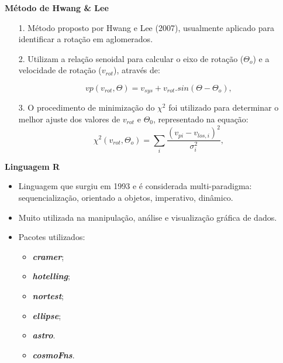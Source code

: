 \documentclass[xcolor=dvipsnames,10pt]{beamer}
\begin{document}
\begin{frame}{\textbf{Método de Hwang \& Lee}}
  \begin{enumerate}
    \item[1.] Método proposto por Hwang e Lee (2007), usualmente aplicado para identificar a rotação em aglomerados.
    \item[2.] Utilizam a relação senoidal para calcular o eixo de rotação ($\Theta_o$) e a velocidade de rotação ($v_{rot}$), através de:

    \begin{equation}
      vp(v_{rot}, \Theta) = v_{sys} + v_{rot} . sin(\Theta - \Theta_o) ,
      \label{eq:hwanglee1}
      \end{equation}
    \item[3.] O procedimento de minimização do $\chi^2$ foi utilizado para determinar o melhor ajuste dos valores de $v_{rot}$ e $\Theta_0$, representado na equação: 
      \begin{equation}
       \chi^2 (v_{rot}, \Theta_o) = \sum_i{\frac{(v_{pi} - v_{los, i})^2}{\sigma^{2}_{i}}} ,
       \label{hwanglee2}
      \end{equation}
  \end{enumerate}
\end{frame}

\begin{frame}{\textbf{Linguagem R}}
	\begin{itemize}
		\item Linguagem que surgiu em 1993 e é considerada multi-paradigma: sequencialização, orientado a objetos, imperativo, dinâmico.
		\item Muito utilizada na manipulação, análise e visualização gráfica de dados.
		\item Pacotes utilizados:
		\begin{itemize}
			\item \textbf{\textit{cramer}};
      \item \textbf{\textit{hotelling}};
      \item \textbf{\textit{nortest}};
      \item \textbf{\textit{ellipse}};
			\item \textbf{\textit{astro}}.
			\item \textbf{\textit{cosmoFns}}.
		\end{itemize}
	\end{itemize}
\end{frame}
\end{document}

